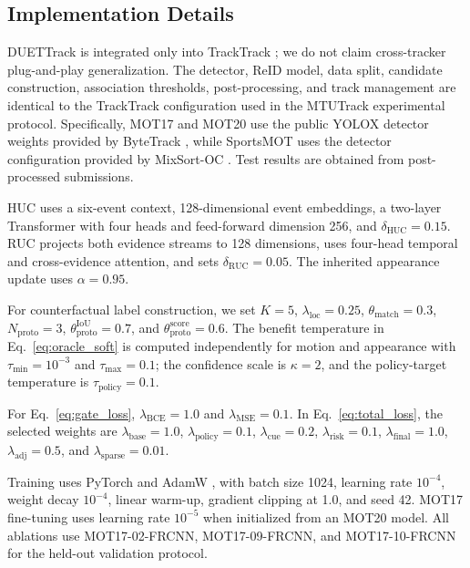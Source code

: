 \documentclass[a4paper,fleqn]{cas-sc}
\begin{document}
\subsection{Implementation Details}
DUETTrack is integrated only into TrackTrack \cite{shim2025focusing}; we do not claim cross-tracker plug-and-play generalization. The detector, ReID model, data split, candidate construction, association thresholds, post-processing, and track management are identical to the TrackTrack configuration used in the MTUTrack experimental protocol. Specifically, MOT17 and MOT20 use the public YOLOX \cite{ge2021yolox} detector weights provided by ByteTrack \cite{zhang2022bytetrack}, while SportsMOT uses the detector configuration provided by MixSort-OC \cite{cui2023sportsmot}. Test results are obtained from post-processed submissions.

HUC uses a six-event context, 128-dimensional event embeddings, a two-layer Transformer with four heads and feed-forward dimension 256, and $\delta_{\mathrm{HUC}}=0.15$. RUC projects both evidence streams to 128 dimensions, uses four-head temporal and cross-evidence attention, and sets $\delta_{\mathrm{RUC}}=0.05$. The inherited appearance update uses $\alpha=0.95$.

For counterfactual label construction, we set $K=5$, $\lambda_{\mathrm{loc}}=0.25$, $\theta_{\mathrm{match}}=0.3$, $N_{\mathrm{proto}}=3$, $\theta_{\mathrm{proto}}^{\mathrm{IoU}}=0.7$, and $\theta_{\mathrm{proto}}^{\mathrm{score}}=0.6$. The benefit temperature in Eq.~\eqref{eq:oracle_soft} is computed independently for motion and appearance with $\tau_{\min}=10^{-3}$ and $\tau_{\max}=0.1$; the confidence scale is $\kappa=2$, and the policy-target temperature is $\tau_{\mathrm{policy}}=0.1$.

For Eq.~\eqref{eq:gate_loss}, $\lambda_{\mathrm{BCE}}=1.0$ and $\lambda_{\mathrm{MSE}}=0.1$. In Eq.~\eqref{eq:total_loss}, the selected weights are $\lambda_{\mathrm{base}}=1.0$, $\lambda_{\mathrm{policy}}=0.1$, $\lambda_{\mathrm{cue}}=0.2$, $\lambda_{\mathrm{risk}}=0.1$, $\lambda_{\mathrm{final}}=1.0$, $\lambda_{\mathrm{adj}}=0.5$, and $\lambda_{\mathrm{sparse}}=0.01$.

Training uses PyTorch \cite{paszke2019pytorch} and AdamW \cite{kingma2014adam,loshchilov2017decoupled}, with batch size 1024, learning rate $10^{-4}$, weight decay $10^{-4}$, linear warm-up, gradient clipping at 1.0, and seed 42. MOT17 fine-tuning uses learning rate $10^{-5}$ when initialized from an MOT20 model. All ablations use MOT17-02-FRCNN, MOT17-09-FRCNN, and MOT17-10-FRCNN for the held-out validation protocol.
\end{document}
